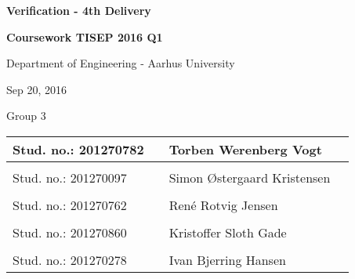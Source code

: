 
\centerline{\Huge\bfseries\color{ThemeColor}Verification  - 4th Delivery}

\vspace{1em}
\centerline{\Large\bfseries\color{BlackColor} Coursework TISEP 2016 Q1}



\vspace{5em}
\centerline{\large\bfseries\color{BlackColor}}
\centerline{\large\color{BlackColor}Department of Engineering - Aarhus University}

\vspace{0.5em}
\centerline{\large\color{BlackColor} Sep 20, 2016}

\vspace{0.5em}
\centerline{\large\color{BlackColor} Group 3}

\vspace{25em}

\begin{center}
   \begin{tabular}{ l p{3cm} l l }
   Stud. no.: 201270782 && Torben Werenberg Vogt & \\\hline
   & & \\
   Stud. no.: 201270097 && Simon Østergaard Kristensen & \\\hline
   & & \\
   Stud. no.: 201270762 && René Rotvig Jensen & \\\hline
   & & \\
   Stud. no.: 201270860 && Kristoffer Sloth Gade & \\\hline
   & & \\
   Stud. no.: 201270278 &&  Ivan Bjerring Hansen & \\\hline
   \end{tabular}
\end{center}
\thispagestyle{empty} %
\restoregeometry

